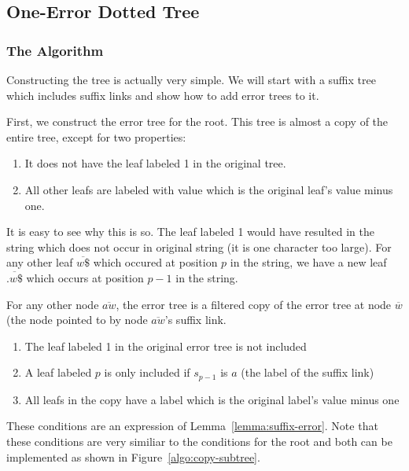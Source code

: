 \subsection{One-Error Dotted Tree}
\subsubsection{The Algorithm}

Constructing the tree is actually very simple. We will start with a suffix tree which includes suffix links and show how to add error trees to it.

First, we construct the error tree for the root. This tree is almost a copy of the entire tree, except for two properties:

\begin{enumerate}
\item It does not have the leaf labeled 1 in the original tree.
\item All other leafs are labeled with value which is the original leaf's value minus one.
\end{enumerate}

It is easy to see why this is so. The leaf labeled 1 would have resulted in the string  which does not occur in original string (it is one character too large). For any other leaf $\overline{w\$}$ which occured at position $p$ in the string, we have a new leaf $\overline{.w\$}$ which occurs at position $p-1$ in the string.

For any other node $\overline{aw}$, the error tree is a filtered copy of the error tree at node $\overline{w}$ (the node pointed to by node $\overline{aw}$'s suffix link.

\begin{enumerate}
\item The leaf labeled 1 in the original error tree is not included
\item A leaf labeled $p$ is only included if $s_{p-1}$ is $a$ (the label of the suffix link)
\item All leafs in the copy have a label which is the original label's value minus one
\end{enumerate}

These conditions are an expression of Lemma~\ref{lemma:suffix-error}.
Note that these conditions are very similiar to the conditions for the root and both can be implemented as shown in Figure~\ref{algo:copy-subtree}.



